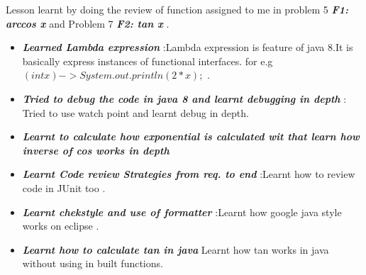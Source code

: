 \documentclass[final]{beamer}
\newlength{\onecolwid}
\newlength{\twocolwid}
\begin{document}
\begin{frame}[t]
\begin{columns}[t]
\begin{column}{\twocolwid}
\begin{columns}[t,totalwidth=\twocolwid]
\begin{column}{\onecolwid}
\begin{block}{Lesson learnt by doing the review of function assigned to me in problem 5  \textbf{\textit{ F1: arccos x}} and Problem 7  \textbf{\textit{ F2: tan x}} .}
\begin{itemize}
\item  \textit{\textbf{Learned Lambda expression}} :Lambda expression is feature of java 8.It is basically express instances of functional interfaces. for e.g $(int x)->System.out.println(2*x); $ .
\item  \textit{\textbf{Tried to debug the code in java 8 and learnt debugging in depth}} : Tried to use watch point and learnt debug in depth.
\item \textit{\textbf{Learnt to calculate how exponential is calculated wit that learn how inverse of cos works in depth}} 
\item  \textit{\textbf{Learnt Code review Strategies from req. to end}} :Learnt how to review code in JUnit too .
\item  \textit{\textbf{Learnt chekstyle and use of formatter }} :Learnt how google java style works on eclipse .
\item \textit{\textbf{Learnt how to calculate tan in java }} Learnt how tan works in java without using in built functions.
\end{itemize}


\end{block}


\end{column} %

\end{columns} %



\end{column}
\end{columns}
\end{frame}
\end{document}
